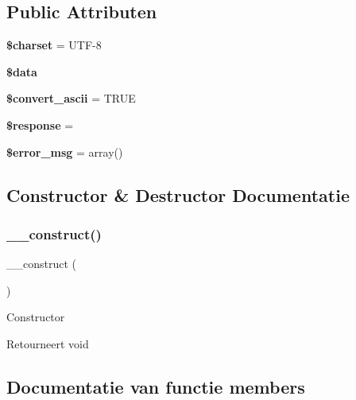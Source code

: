 \subsection*{Public Attributen}
\begin{DoxyCompactItemize}
\item 
\mbox{\label{class_c_i___trackback_af10158dd74b75f1d337e83102d6b82ce}} 
{\bfseries \$charset} = \textquotesingle{}U\+TF-\/8\textquotesingle{}
\item 
{\bfseries \$data}
\item 
\mbox{\label{class_c_i___trackback_a488490c694dfefb9578fb22e0208e008}} 
{\bfseries \$convert\+\_\+ascii} = T\+R\+UE
\item 
\mbox{\label{class_c_i___trackback_af4b6fb1bbc77ccc05f10da3b16935b99}} 
{\bfseries \$response} = \textquotesingle{}\textquotesingle{}
\item 
\mbox{\label{class_c_i___trackback_acf910733622c1fa671b9f755c69c2ec7}} 
{\bfseries \$error\+\_\+msg} = array()
\end{DoxyCompactItemize}


\subsection{Constructor \& Destructor Documentatie}
\mbox{\label{class_c_i___trackback_a095c5d389db211932136b53f25f39685}} 
\subsubsection{\texorpdfstring{\_\_construct()}{\_\_construct()}}
{\footnotesize\ttfamily \+\_\+\+\_\+construct (\begin{DoxyParamCaption}{ }\end{DoxyParamCaption})}

Constructor

\begin{DoxyReturn}{Retourneert}
void 
\end{DoxyReturn}


\subsection{Documentatie van functie members}
\mbox{\label{class_c_i___trackback_a0029bda7d34a222a5bda4ac894c31ac1}} 
